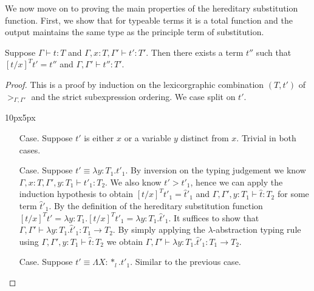 We now move on to proving the main properties of the hereditary
substitution function.  First, we show that for typeable terms it is a
total function and the output maintains the same type as the principle
term of substitution.
\begin{lemma}
  \label{lemma:total_ssfp}
  Suppose $\Gamma \vdash t : T$ and $\Gamma, x:T, \Gamma' \vdash t':T'$. Then
  there exists a term $t''$ such that $[t/x]^T t' = t''$ and 
  $\Gamma,\Gamma' \vdash t'':T'$.
\end{lemma}
\begin{proof}
  This is a proof by induction on the lexicorgraphic combination
  $(T, t')$ of $>_{\Gamma,\Gamma'}$ and the strict subexpression
  ordering.  We case split on $t'$.
\vspace{-20px}
\begin{changemargin}{10px}{5px}\noindent
\begin{itemize}
\item[Case.] Suppose $t'$ is either $x$ or a variable $y$ distinct from $x$.  
  Trivial in both cases.
  
\item[Case.] Suppose $t' \equiv \lambda y:T_1.t'_1$.  By inversion on the
  typing judgement we know $\Gamma,x:T,\Gamma',y:T_1 \vdash t'_1:T_2$.
  We also know $t' > t'_1$, hence we can apply the induction hypothesis to obtain
  $[t/x]^T t'_1 = \hat{t}'_1$ and $\Gamma,\Gamma',y:T_1 \vdash \hat{t}:T_2$
  for some term $\hat{t}'_1$.  By the definition of the hereditary substitution function 
  $[t/x]^T t' = \lambda y:T_1.[t/x]^T t'_1 = \lambda y:T_1.\hat{t}'_1$.  It suffices
  to show that $\Gamma,\Gamma' \vdash \lambda y:T_1.\hat{t}'_1:T_1 \to T_2$.  
  By simply applying the $\lambda$-abstraction typing rule using
  $\Gamma,\Gamma',y:T_1 \vdash \hat{t}:T_2$ we obtain 
  $\Gamma,\Gamma' \vdash \lambda y:T_1.\hat{t}'_1:T_1 \to T_2$.
  
\item[Case.] Suppose $t' \equiv \Lambda X:*_l.t'_1$.  Similar to the previous case.
  

\end{itemize}
\end{changemargin}
\end{proof}
